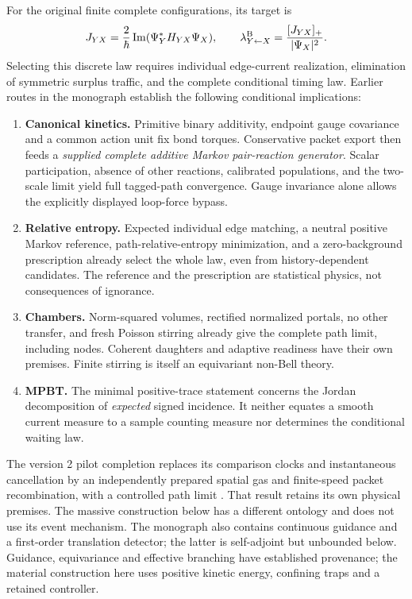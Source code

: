 \documentclass[11pt]{article}
\theoremstyle{definition}\newtheorem{assumption}[theorem]{Constitutive assumption}
\theoremstyle{remark}\newtheorem{remark}[theorem]{Remark}
\begin{document}
For the original finite complete configurations, its target is
\begin{equation}\label{eq:Bell}
 J_{YX}=\frac{2}{\hbar}\operatorname{Im}(\Psi_Y^*H_{YX}\Psi_X),
 \qquad \lambda^{\rm B}_{Y\leftarrow X}=\frac{[J_{YX}]_+}{|\Psi_X|^2}.
\end{equation}
Selecting this discrete law requires individual edge-current realization, elimination of symmetric surplus traffic, and the complete conditional timing law. Earlier routes in the monograph establish the following conditional implications:
\begin{enumerate}
\item \textbf{Canonical kinetics.} Primitive binary additivity, endpoint gauge covariance and a common action unit fix bond torques. Conservative packet export then feeds a \emph{supplied complete additive Markov pair-reaction generator}. Scalar participation, absence of other reactions, calibrated populations, and the two-scale limit yield full tagged-path convergence. Gauge invariance alone allows the explicitly displayed loop-force bypass.
\item \textbf{Relative entropy.} Expected individual edge matching, a neutral positive Markov reference, path-relative-entropy minimization, and a zero-background prescription already select the whole law, even from history-dependent candidates. The reference and the prescription are statistical physics, not consequences of ignorance.
\item \textbf{Chambers.} Norm-squared volumes, rectified normalized portals, no other transfer, and fresh Poisson stirring already give the complete path limit, including nodes. Coherent daughters and adaptive readiness have their own premises. Finite stirring is itself an equivariant non-Bell theory.
\item \textbf{MPBT.} The minimal positive-trace statement concerns the Jordan decomposition of \emph{expected} signed incidence. It neither equates a smooth current measure to a sample counting measure nor determines the conditional waiting law.
\end{enumerate}
The version 2 pilot completion replaces its comparison clocks and instantaneous cancellation by an independently prepared spatial gas and finite-speed packet recombination, with a controlled path limit \cite{Pilot}. That result retains its own physical premises. The massive construction below has a different ontology and does not use its event mechanism. The monograph also contains continuous guidance and a first-order translation detector; the latter is self-adjoint but unbounded below. Guidance, equivariance and effective branching have established provenance; the material construction here uses positive kinetic energy, confining traps and a retained controller.
\end{document}
